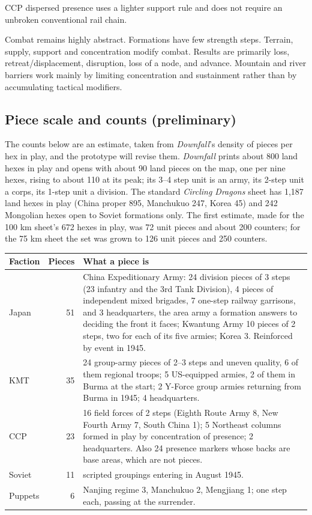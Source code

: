 \documentclass[11pt]{article}
\begin{document}
CCP dispersed presence uses a lighter support rule and does not require an unbroken conventional rail chain.

Combat remains highly abstract. Formations have few strength steps. Terrain, supply, support and concentration modify combat. Results are primarily loss, retreat/displacement, disruption, loss of a node, and advance. Mountain and river barriers work mainly by limiting concentration and sustainment rather than by accumulating tactical modifiers.

\subsection{Piece scale and counts (preliminary)}\label{sub:pieces}
The counts below are an estimate, taken from \emph{Downfall}'s density of pieces per hex in play, and the prototype will revise them. \emph{Downfall} prints about 800 land hexes in play and opens with about 90 land pieces on the map, one per nine hexes, rising to about 110 at its peak; its 3--4 step unit is an army, its 2-step unit a corps, its 1-step unit a division. The standard \emph{Circling Dragons} sheet has 1,187 land hexes in play (China proper 895, Manchukuo 247, Korea 45) and 242 Mongolian hexes open to Soviet formations only. The first estimate, made for the 100 km sheet's 672 hexes in play, was 72 unit pieces and about 200 counters; for the 75 km sheet the set was grown to 126 unit pieces and 250 counters.

\begin{center}
\begin{tabular}{lrp{}}
\toprule Faction & Pieces & What a piece is \\\midrule
Japan & 51 & China Expeditionary Army: 24 division pieces of 3 steps (23 infantry and the 3rd Tank Division), 4 pieces of independent mixed brigades, 7 one-step railway garrisons, and 3 headquarters, the area army a formation answers to deciding the front it faces; Kwantung Army 10 pieces of 2 steps, two for each of its five armies; Korea 3. Reinforced by event in 1945.\\
KMT & 35 & 24 group-army pieces of 2--3 steps and uneven quality, 6 of them regional troops; 5 US-equipped armies, 2 of them in Burma at the start; 2 Y-Force group armies returning from Burma in 1945; 4 headquarters.\\
CCP & 23 & 16 field forces of 2 steps (Eighth Route Army 8, New Fourth Army 7, South China 1); 5 Northeast columns formed in play by concentration of presence; 2 headquarters. Also 24 presence markers whose backs are base areas, which are not pieces.\\
Soviet & 11 & scripted groupings entering in August 1945.\\
Puppets & 6 & Nanjing regime 3, Manchukuo 2, Mengjiang 1; one step each, passing at the surrender.\\
\bottomrule
\end{tabular}
\end{center}
\end{document}
